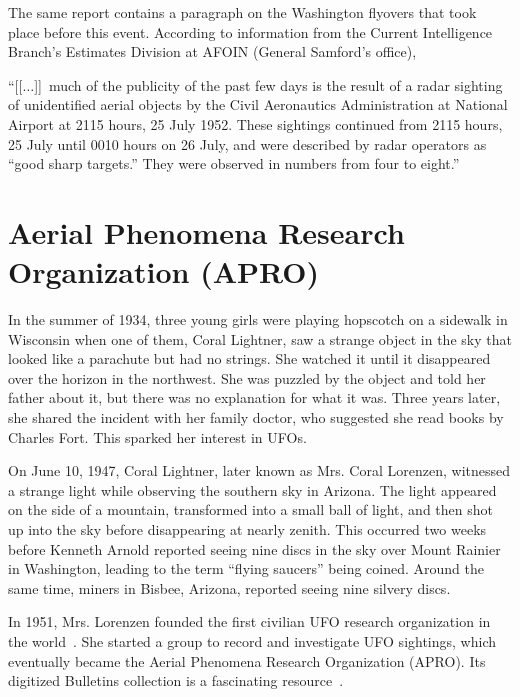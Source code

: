 The same report contains a paragraph on the Washington flyovers that took place before this event.
According to information from the Current Intelligence Branch's Estimates Division at AFOIN
(General Samford's office),
\begin{svgraybox}
``[[$\ldots$]]~much of the publicity of the past few days is the result of a radar sighting of unidentified aerial objects by the
Civil Aeronautics Administration at National Airport at 2115 hours, 25 July 1952.
These sightings continued from 2115 hours, 25 July until 0010 hours on 26 July, and were described by radar operators as ``good sharp targets.''
They were observed in numbers from four to eight.''
\end{svgraybox}


\section{Aerial Phenomena Research Organization (APRO)}
\label{2023-UFO-part-History-chapter-post-1945-pre-1953-APRO}

In the summer of 1934, three young girls were playing hopscotch on a sidewalk in Wisconsin when one of them, Coral Lightner, saw a strange object in the sky that looked like a parachute but had no strings. She watched it until it disappeared over the horizon in the northwest. She was puzzled by the object and told her father about it, but there was no explanation for what it was. Three years later, she shared the incident with her family doctor, who suggested she read books by Charles Fort. This sparked her interest in UFOs.

On June 10, 1947, Coral Lightner, later known as Mrs. Coral Lorenzen, witnessed a strange light while observing the southern sky in Arizona. The light appeared on the side of a mountain, transformed into a small ball of light, and then shot up into the sky before disappearing at nearly zenith. This occurred two weeks before Kenneth Arnold reported seeing nine discs in the sky over Mount Rainier in Washington, leading to the term ``flying saucers'' being coined. Around the same time, miners in Bisbee, Arizona, reported seeing nine silvery discs.

In 1951, Mrs. Lorenzen founded the first civilian UFO research organization in the world~\cite{Lorenzen1966Jan}. She started a group to record and investigate UFO sightings, which eventually became the Aerial Phenomena Research Organization (APRO). Its digitized Bulletins collection is a fascinating resource~\cite{APROBulletins}.

